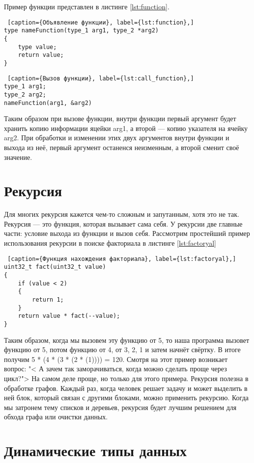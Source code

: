 \documentclass{bmstu}
\begin{document}
Пример функции представлен в листинге \ref{lst:function}.

\begin{lstlisting} [caption={Объявление функции}, label={lst:function},]
type nameFunction(type_1 arg1, type_2 *arg2)
{
    type value;
    return value;
}
\end{lstlisting}

\begin{lstlisting} [caption={Вызов функции}, label={lst:call_function},]
type_1 arg1;
type_2 arg2;
nameFunction(arg1, &arg2)
\end{lstlisting}

Таким образом при вызове функции, внутри функции первый аргумент будет хранить копию информации яцейки arg1,
а второй --- копию указателя на ячейку arg2. 
При обработки и изменении этих двух аргументов внутри функции и выхода из неё, первый аргумент останенся неизменным, а второй сменит своё значение. 

\section{Рекурсия}

Для многих рекурсия кажется чем-то сложным и запутанным, хотя это не так.
Рекурсия --- это функция, которая вызывает сама себя.
У рекурсии две главные части: условие выхода из функции и вызов себя.
Рассмотрим простейший пример использования рекурсии в поиске факториала в листинге \ref{lst:factoryal}

\begin{lstlisting} [caption={Функция нахождения факториала}, label={lst:factoryal},]
uint32_t fact(uint32_t value)
{
    if (value < 2)
    {
        return 1;
    }
    return value * fact(--value);
}
\end{lstlisting}

Таким образом, когда мы вызовем эту функцию от 5, то наша программа вызовет функцию от 5, потом функцию от 4, от 3, 2, 1 и затем начнёт свёртку.
В итоге получим 5 * (4 * (3 * (2 * (1)))) = 120.
Смотря на этот пример возникает вопрос: "< А зачем так заморачиваться, когда можно сделать проще через цикл?">
На самом деле проще, но только для этого примера.
Рекурсия полезна в обработке графов.
Каждый раз, когда человек решает задачу и может выделить в ней блок, который связан с другими блоками, можно применить рекурсию.
Когда мы затронем тему списков и деревьев, рекурсия будет лучшим решением для обхода графа или очистки данных. 

\section{Динамические типы данных}
\end{document}
